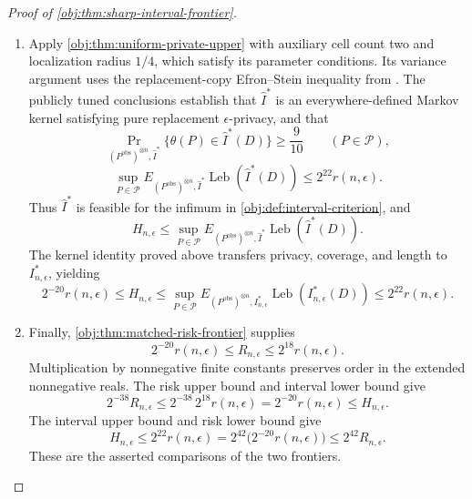 \documentclass[11pt]{article}
\begin{document}
\begin{proof}[Proof of \cref{obj:thm:sharp-interval-frontier}]
\begin{enumerate}
The numerical calibration is
\[
2^{-20}\le\frac{11}{20}\,2^{-14}.
\]
Multiplying by the nonnegative benchmark and using the separation bound gives
\[
2^{-20}r(n,\epsilon)
\le
\frac{11}{20}\,2^{-14}r(n,\epsilon)
\le
\frac{11}{20}\Delta
\le
\sup_{P\in\mathcal P}
E_{(P^{\mathrm{obs}})^{\otimes n},I}
\operatorname{Leb}(I(D)).
\]
Since this holds for every feasible \(I\), taking the defining infimum proves
\[
2^{-20}r(n,\epsilon)\le H_{n,\epsilon}.
\]

\item Apply \cref{obj:thm:uniform-private-upper} with auxiliary cell count two and localization radius \(1/4\), which satisfy its parameter conditions. Its variance argument uses the replacement-copy Efron--Stein inequality from
\citep[Theorem 3.1, printed p.~54]{BoucheronLugosiMassart2013}.
The publicly tuned conclusions establish that \(\widehat I^*\) is an everywhere-defined Markov kernel satisfying pure replacement \(\epsilon\)-privacy, and that
\[
\Pr_{(P^{\mathrm{obs}})^{\otimes n},\widehat I^*}
\{\theta(P)\in\widehat I^*(D)\}
\ge\frac9{10}
\qquad(P\in\mathcal P),
\]
\[
\sup_{P\in\mathcal P}
E_{(P^{\mathrm{obs}})^{\otimes n},\widehat I^*}
\operatorname{Leb}(\widehat I^*(D))
\le2^{22}r(n,\epsilon).
\]
Thus \(\widehat I^*\) is feasible for the infimum in
\cref{obj:def:interval-criterion}, and
\[
H_{n,\epsilon}
\le
\sup_{P\in\mathcal P}
E_{(P^{\mathrm{obs}})^{\otimes n},\widehat I^*}
\operatorname{Leb}(\widehat I^*(D)).
\]
The kernel identity proved above transfers privacy, coverage, and length to \(I^*_{n,\epsilon}\), yielding
\[
2^{-20}r(n,\epsilon)
\le H_{n,\epsilon}
\le
\sup_{P\in\mathcal P}
E_{(P^{\mathrm{obs}})^{\otimes n},I^*_{n,\epsilon}}
\operatorname{Leb}(I^*_{n,\epsilon}(D))
\le2^{22}r(n,\epsilon).
\]

\item Finally, \cref{obj:thm:matched-risk-frontier} supplies
\[
2^{-20}r(n,\epsilon)
\le R_{n,\epsilon}
\le2^{18}r(n,\epsilon).
\]
Multiplication by nonnegative finite constants preserves order in the extended nonnegative reals. The risk upper bound and interval lower bound give
\[
2^{-38}R_{n,\epsilon}
\le
2^{-38}\,2^{18}r(n,\epsilon)
=
2^{-20}r(n,\epsilon)
\le H_{n,\epsilon}.
\]
The interval upper bound and risk lower bound give
\[
H_{n,\epsilon}
\le2^{22}r(n,\epsilon)
=
2^{42}\bigl(2^{-20}r(n,\epsilon)\bigr)
\le2^{42}R_{n,\epsilon}.
\]
These are the asserted comparisons of the two frontiers.
\end{enumerate}
\end{proof}
\end{document}
